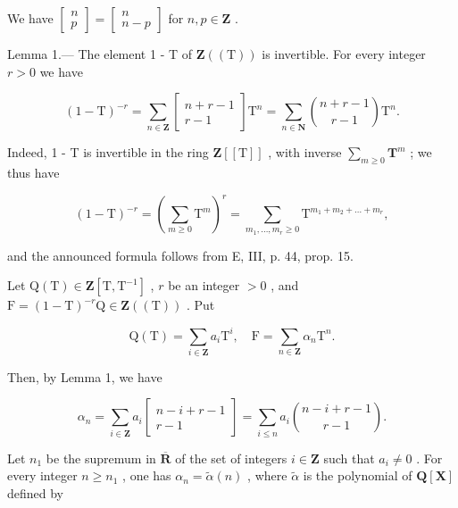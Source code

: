 We have \(\begin{bmatrix} n \\ p \end{bmatrix} = \begin{bmatrix} n \\ n - p \end{bmatrix}\) for \(n, p \in \mathbf{Z}\) .

Lemma 1.--- The element 1 - T of \(\mathbf{Z}((\mathrm{T}))\) is invertible. For every integer \(r > 0\) we have

\[
(1 - \mathrm{T}) ^ {- r} = \sum_ {n \in \mathbf {Z}} \left[ \begin{array}{c} n + r - 1 \\ r - 1 \end{array} \right] \mathrm{T} ^ {n} = \sum_ {n \in \mathbf {N}} \binom {n + r - 1} {r - 1} \mathrm{T} ^ {n}.
\]

Indeed, 1 - T is invertible in the ring \(\mathbf{Z}[[\mathrm{T}]]\) , with inverse \(\sum_{m\geqslant 0}\mathbf{T}^m\) ; we thus have

\[
(1 - \mathrm{T}) ^ {- r} = (\sum_ {m \geqslant 0} \mathrm{T} ^ {m}) ^ {r} = \sum_ {m _ {1}, \dots , m _ {r} \geqslant 0} \mathrm{T} ^ {m _ {1} + m _ {2} + \dots + m _ {r}},
\]

and the announced formula follows from E, III, p. 44, prop. 15.

Let \(\mathrm{Q}(\mathrm{T}) \in \mathbf{Z}[\mathrm{T}, \mathrm{T}^{-1}]\) , \(r\) be an integer \(> 0\) , and \(\mathrm{F} = (1 - \mathrm{T})^{-r}\mathrm{Q} \in \mathbf{Z}((\mathrm{T}))\) . Put

\[
\mathrm{Q} (\mathrm{T}) = \sum_ {i \in \mathbf {Z}} a _ {i} \mathrm{T} ^ {i}, \quad \mathrm{F} = \sum_ {n \in \mathbf {Z}} \alpha_ {n} \mathrm{T} ^ {n}.
\]

Then, by Lemma 1, we have

\[
\alpha_ {n} = \sum_ {i \in \mathbf {Z}} a _ {i} \left[ \begin{array}{c} n - i + r - 1 \\ r - 1 \end{array} \right] = \sum_ {i \leqslant n} a _ {i} \binom {n - i + r - 1} {r - 1}.
\]

Let \(n_1\) be the supremum in \(\overline{\mathbf{R}}\) of the set of integers \(i \in \mathbf{Z}\) such that \(a_i \neq 0\) . For every integer \(n \geqslant n_1\) , one has \(\alpha_n = \tilde{\alpha}(n)\) , where \(\tilde{\alpha}\) is the polynomial of \(\mathbf{Q}[\mathbf{X}]\) defined by

